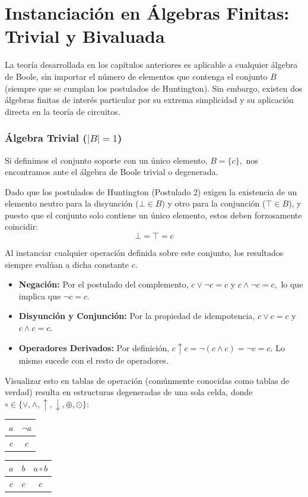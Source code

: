 \chapter[Álgebras Finitas: Trivial y Bivaluada]{Instanciación en Álgebras Finitas: Trivial y Bivaluada}

La teoría desarrollada en los capítulos anteriores es aplicable a cualquier álgebra de Boole, sin importar el número de elementos que contenga el conjunto $B$ (siempre que se cumplan los postulados de Huntington). Sin embargo, existen dos álgebras finitas de interés particular por su extrema simplicidad y su aplicación directa en la teoría de circuitos.

\subsection{Álgebra Trivial ($|B| = 1$)}
Si definimos el conjunto soporte con un único elemento, $B = \{ c \},$ nos encontramos ante el álgebra de Boole trivial o degenerada. 

Dado que los postulados de Huntington (Postulado 2) exigen la existencia de un elemento neutro para la disyunción ($\bot \in B$) y otro para la conjunción ($\top \in B$), y puesto que el conjunto solo contiene un único elemento, estos deben forzosamente coincidir:
\[ \bot = \top = c \]

Al instanciar cualquier operación definida sobre este conjunto, los resultados siempre evalúan a dicha constante $c.$ 
\begin{itemize}
    \item \textbf{Negación:} Por el postulado del complemento, $c \vee \neg c = c$ y $c \wedge \neg c = c,$ lo que implica que $\neg c = c.$
    \item \textbf{Disyunción y Conjunción:} Por la propiedad de idempotencia, $c \vee c = c$ y $c \wedge c = c.$
    \item \textbf{Operadores Derivados:} Por definición, $c \uparrow c = \neg (c \wedge c) = \neg c = c.$ Lo mismo sucede con el resto de operadores.
\end{itemize}

Visualizar esto en tablas de operación (comúnmente conocidas como tablas de verdad) resulta en estructuras degeneradas de una sola celda, donde $\circ \in \{ \vee, \wedge, \uparrow, \downarrow, \oplus, \odot \}:$

\begin{center}
\begin{tabular}{c|c}
$a$ & $\neg a$ \\
\hline
$c$ & $c$
\end{tabular}
\qquad
\begin{tabular}{cc|c}
$a$ & $b$ & $a \circ b$ \\
\hline
$c$ & $c$ & $c$
\end{tabular}
\end{center}

